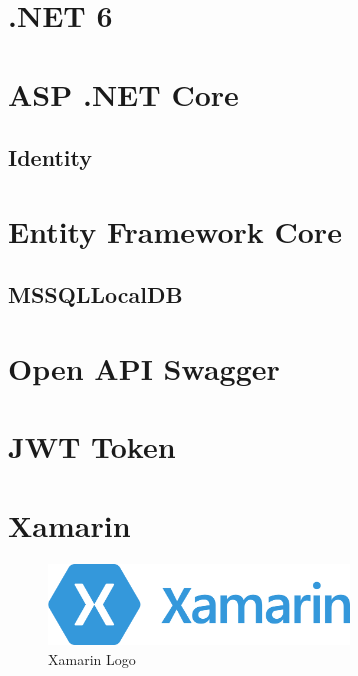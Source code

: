 \section{.NET 6}
\lipsum[5-12]

\section{ASP .NET Core}
\lipsum[12-17]

\subsection{Identity}
\lipsum[1-2]

\section{Entity Framework Core}
\lipsum[17-20]

\subsection{MSSQLLocalDB}
\lipsum[30-40]

\section{Open API Swagger}
\lipsum[20-22]

\section{JWT Token}
\lipsum[22-25]
\newpage

\section{Xamarin}
\cite{XML}
\begin{figure}[h]
    \begin{center}
        \includegraphics*[width=8cm]{pics/Xamarin_logo.png}
        \caption[Xamarin Logo]{Xamarin Logo \cite{XMLlogo}}
    \end{center}
\end{figure}
